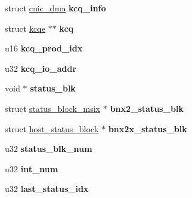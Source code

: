 \begin{DoxyCompactItemize}
\item 
\hypertarget{structcnic__local_a20c0d6cd9bb1a041ca6e9dc8d44d3a95}{
struct \hyperlink{structcnic__dma}{cnic\_\-dma} {\bfseries kcq\_\-info}}
\label{structcnic__local_a20c0d6cd9bb1a041ca6e9dc8d44d3a95}

\item 
\hypertarget{structcnic__local_a0b062c39cb9195e743378f1f2a1a9b9f}{
struct \hyperlink{structkcqe}{kcqe} $\ast$$\ast$ {\bfseries kcq}}
\label{structcnic__local_a0b062c39cb9195e743378f1f2a1a9b9f}

\item 
\hypertarget{structcnic__local_abd8b33b11413b1b49caf5565a4753af7}{
u16 {\bfseries kcq\_\-prod\_\-idx}}
\label{structcnic__local_abd8b33b11413b1b49caf5565a4753af7}

\item 
\hypertarget{structcnic__local_ab0de139f471c9e2dacf93a79f0d3eb27}{
u32 {\bfseries kcq\_\-io\_\-addr}}
\label{structcnic__local_ab0de139f471c9e2dacf93a79f0d3eb27}

\item 
\hypertarget{structcnic__local_a5283d53a19aee5c1218183e443ef710e}{
void $\ast$ {\bfseries status\_\-blk}}
\label{structcnic__local_a5283d53a19aee5c1218183e443ef710e}

\item 
\hypertarget{structcnic__local_a0504b847607d8f6d6f0acdc5926535c8}{
struct \hyperlink{structstatus__block__msix}{status\_\-block\_\-msix} $\ast$ {\bfseries bnx2\_\-status\_\-blk}}
\label{structcnic__local_a0504b847607d8f6d6f0acdc5926535c8}

\item 
\hypertarget{structcnic__local_a1ccab7b2f24ed65637173b141ee8e746}{
struct \hyperlink{structhost__status__block}{host\_\-status\_\-block} $\ast$ {\bfseries bnx2x\_\-status\_\-blk}}
\label{structcnic__local_a1ccab7b2f24ed65637173b141ee8e746}

\item 
\hypertarget{structcnic__local_a3bbceb1bd184d8b1eed99f2b1596d365}{
u32 {\bfseries status\_\-blk\_\-num}}
\label{structcnic__local_a3bbceb1bd184d8b1eed99f2b1596d365}

\item 
\hypertarget{structcnic__local_a3f0d45f10352bae381c23be284d34755}{
u32 {\bfseries int\_\-num}}
\label{structcnic__local_a3f0d45f10352bae381c23be284d34755}

\item 
\hypertarget{structcnic__local_afa12bf0c6aa00968102e28ab26ee5978}{
u32 {\bfseries last\_\-status\_\-idx}}
\label{structcnic__local_afa12bf0c6aa00968102e28ab26ee5978}


\end{DoxyCompactItemize}
